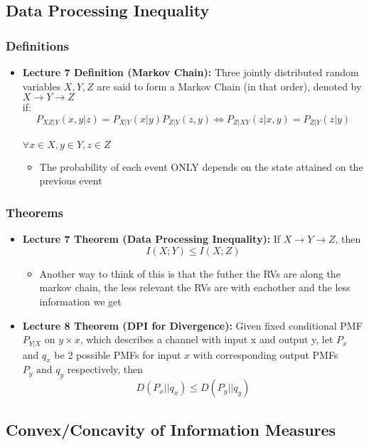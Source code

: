 \documentclass{article}
\begin{document}
\subsection{Data Processing Inequality}
\subsubsection{Definitions}
\begin{itemize}
    \item \textbf{Lecture 7 Definition (Markov Chain):} Three jointly distributed random variables \(X,Y,Z\) are said to form a Markov Chain (in that order), denoted by \(X \to Y \to Z\)
    \\if:
    \[P_{XZ|Y}(x,y|z) = P_{X|Y}(x|y) P_{Z|Y}(z,y) \Longleftrightarrow P_{Z|XY}(z|x,y) = P_{Z|Y}(z|y)\]
    \\ \(\forall x \in X, y \in Y, z \in Z\)
    \\
    \begin{itemize}
        \item The probability of each event ONLY depends on the state attained on the previous event
    \end{itemize}
\end{itemize}
\subsubsection{Theorems}
\begin{itemize}
    \item \textbf{Lecture 7 Theorem (Data Processing Inequality):} If \(X \to Y \to Z\), then 
    \[I(X;Y) \leq I(X;Z)\]
    \begin{itemize}
        \item Another way to think of this is that the futher the RVs are along the markov chain, the less relevant the RVs are with eachother and the less information we get
    \end{itemize}
    \item \textbf{Lecture 8 Theorem (DPI for Divergence):} Given fixed conditional PMF \(P_{Y|X}\) on \(y \times x\), which describes a channel with input x and output y,
    let \(P_x\) and \(q_x\) be 2 possible PMFs for input \(x\) with corresponding output PMFs \(P_y \text{ and } q_y\) respectively, then
    \[D(P_x||q_x) \leq D(P_y||q_y)\]
\end{itemize}

\subsection{Convex/Concavity of Information Measures}
\end{document}
